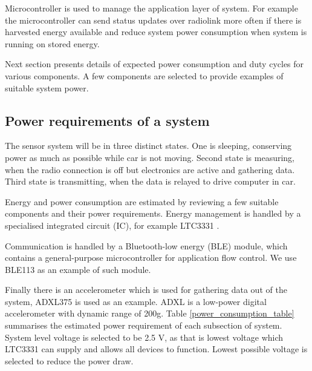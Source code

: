Microcontroller is used to manage the application layer of system. For example the microcontroller can send status updates over radiolink more often if there is harvested energy available and reduce system power consumption when system is running on stored energy.

Next section presents details of expected power consumption and duty cycles for various components. A few components are selected to provide examples of suitable system power.

\subsection{Power requirements of a system} \label{sect:power_requirement}
The sensor system will be in three distinct states. One is sleeping, conserving power as much as possible while car is not moving.
Second state is measuring, when the radio connection is off but electronics are active and gathering data.
Third state is transmitting, when the data is relayed to drive computer in car.

Energy and power consumption are estimated by reviewing a few suitable components and their power requirements. 
Energy management is handled by a specialised integrated circuit (IC), for example LTC3331 \cite{Technology}.

Communication is handled by a Bluetooth-low energy (BLE) module, which contains a general-purpose microcontroller for application flow control.
We use BLE113 \cite{Bluegiga2013} as an example of such module.

Finally there is an accelerometer which is used for gathering data out of the system, ADXL375 \cite{ADXLDatasheet} is used as an example. ADXL is a low-power digital accelerometer with dynamic range of 200g. Table \ref{power_consumption_table}  summarises the estimated power requirement of each subsection of system. System level voltage is selected to be 2.5 V, as that is lowest voltage which LTC3331 can supply and allows all devices to function. Lowest possible voltage is selected to reduce the power draw.

\begin{table}[htb]
\caption{\label{power_consumption_table} Current and power consumption of system at different activity levels.}
\begin{center}
\end{center}
\end{table}

